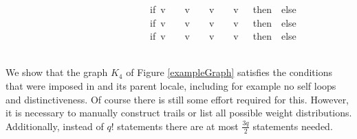 \begin{isabellebody}
\ \ \ \ \ \ \ \ \ \ \ \ \ \ \ \ \ \ \ \ \ \ \ \ \ \ \ \ \ \ {\isacharparenleft}if\ {\isacharparenleft}v\ {\isacharequal}\ {}\ {\isasymand}\ v\ {\isacharequal}\ {}{\isacharparenright}\ {\isasymor}\ {\isacharparenleft}v\ {\isacharequal}\ {}\ {\isasymand}\ v\ {\isacharequal}\ {}{\isacharparenright}\ then\ {}\ else\ \isanewline
\ \ \ \ \ \ \ \ \ \ \ \ \ \ \ \ \ \ \ \ \ \ \ \ \ \ \ \ \ \ {\isacharparenleft}if\ {\isacharparenleft}v\ {\isacharequal}\ {}\ {\isasymand}\ v\ {\isacharequal}\ {}{\isacharparenright}\ {\isasymor}\ {\isacharparenleft}v\ {\isacharequal}\ {}\ {\isasymand}\ v\ {\isacharequal}\ {}{\isacharparenright}\ then\ {}\ else\isanewline
\ \ \ \ \ \ \ \ \ \ \ \ \ \ \ \ \ \ \ \ \ \ \ \ \ \ \ \ \ \ {\isacharparenleft}if\ {\isacharparenleft}v\ {\isacharequal}\ {}\ {\isasymand}\ v\ {\isacharequal}\ {}{\isacharparenright}\ {\isasymor}\ {\isacharparenleft}v\ {\isacharequal}\ {}\ {\isasymand}\ v\ {\isacharequal}\ {}{\isacharparenright}\ then\ {}\ else\ \isanewline
\ \ \ \ \ \ \ \ \ \ \ \ \ \ \ \ \ \ \ \ \ \ \ \ \ \ \ \ \ \ \ {}{\isacharparenright}{\isacharparenright}{\isacharparenright}{\isacharparenright}{\isacharparenright}{\isacharparenright}{\isachardoublequoteclose}\ \isanewline
%
\isadelimproof
%
\endisadelimproof
%
\isatagproof
%
\endisatagproof
{\isafoldproof}%
%
\isadelimproof
%
\endisadelimproof
%
\isadelimproof
%
\endisadelimproof
%
\isatagproof
%
\endisatagproof
{\isafoldproof}%
%
\isadelimproof
%
\endisadelimproof
%
\isadelimproof
%
\endisadelimproof
%
\isatagproof
%
\endisatagproof
{\isafoldproof}%
%
\isadelimproof
%
\endisadelimproof
%
\begin{isamarkuptext}%
We show that the graph $K_4$ of Figure \ref{exampleGraph} satisfies the conditions that were
imposed in 
 and its parent locale, including for example no self loops 
and distinctiveness. Of course there is still some effort required for this. However, it is necessary
to manually construct trails or list all possible weight distributions. Additionally, instead of 
$q!$ statements there are at most $\frac{3q}{2}$ statements needed.%

\end{isamarkuptext}
\end{isabellebody}
